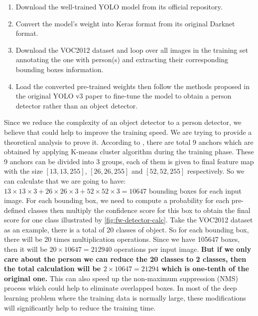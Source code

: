 \begin{enumerate}
    \item Download the well-trained YOLO model from its official repository.
    \item Convert the model's weight into Keras format from its original
    Darknet format.
    \item Download the VOC2012 dataset and loop over all images in the training
    set annotating the one with person(s) and extracting their corresponding
    bounding boxes information.
    \item Load the converted pre-trained weights then follow the methods
    proposed in the original YOLO v3 paper \cite{yolov3-paper-2018} to 
    fine-tune the model to obtain a person detector rather than an object
    detector.
\end{enumerate}

Since we reduce the complexity of an object detector to a person detector,
we believe that could help to improve the training speed. We are trying to
provide a theoretical analysis to prove it.
According to \cite{yolov3-paper-2018}, there are total 9 anchors which are
obtained by applying K-means cluster algorithm during the training phase. 
These 9 anchors can be divided into 3 groups, each of them is given to final 
feature map with the size $[13, 13, 255]$, $[26, 26, 255]$ and $[52, 52, 255]$ 
respectively. 
So we can calculate that we are going to have:
$13 \times 13 \times 3 + 26 \times 26 \times 3 + 52 \times 52 \times 3=10647$
bounding boxes for each input image. For each bounding box, we need to compute
a probability for each pre-defined classes then multiply the confidence score 
for this box to obtain the final score for one class illustrated by
\autoref{fig:fw-detector-calc}. Take the VOC2012 dataset as
an example, there is a total of 20 classes of object. So for each bounding box,
there will be 20 times multiplication operations. Since we have 105647 boxes,
then it will be $20 \times 10647 = 212940$ operations per input image.
\textbf{
    But if we only care about the person we can reduce the 20 classes to 2
    classes, then the total calculation will be $2 \times 10647 = 21294$ which 
    is one-tenth of the original one. 
}
This can also speed up the non-maximum suppression (NMS) process which could 
help to eliminate overlapped boxes.
In most of the deep learning problem where the training data is normally large,
these modifications will significantly help to reduce the training time.

